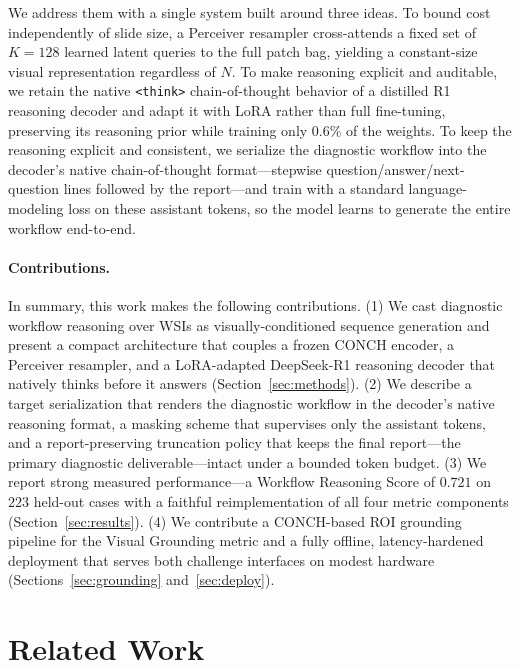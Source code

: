 \documentclass[11pt]{article}
\newcommand{\code}[1]{\texttt{\small #1}}
\begin{document}
We address them with a single system built around three ideas. To bound cost
independently of slide size, a Perceiver resampler cross-attends a fixed set of
$K{=}128$ learned latent queries to the full patch bag, yielding a constant-size
visual representation regardless of $N$. To make reasoning explicit and
auditable, we retain the native \code{<think>} chain-of-thought behavior of a
distilled R1 reasoning decoder and adapt it with LoRA rather than full
fine-tuning, preserving its reasoning prior while training only $0.6\%$ of the
weights. To keep the reasoning explicit and consistent, we serialize the
diagnostic workflow into the decoder's native chain-of-thought format---stepwise
question/answer/next-question lines followed by the report---and train with a
standard language-modeling loss on these assistant tokens, so the model learns to
generate the entire workflow end-to-end.

\paragraph{Contributions.} In summary, this work makes the following
contributions. (1) We cast diagnostic workflow reasoning over WSIs as
visually-conditioned sequence generation and present a compact architecture that
couples a frozen CONCH encoder, a Perceiver resampler, and a LoRA-adapted
DeepSeek-R1 reasoning decoder that natively thinks before it answers
(Section~\ref{sec:methods}). (2) We describe a target serialization that renders
the diagnostic workflow in the decoder's native reasoning format, a masking scheme
that supervises only the assistant tokens, and a report-preserving truncation
policy that keeps the final report---the primary diagnostic deliverable---intact
under a bounded token budget. (3) We report strong
measured performance---a Workflow Reasoning Score of $0.721$ on $223$ held-out
cases with a faithful reimplementation of all four metric components
(Section~\ref{sec:results}). (4) We contribute a CONCH-based ROI grounding
pipeline for the Visual Grounding metric and a fully offline, latency-hardened
deployment that serves both challenge interfaces on modest hardware
(Sections~\ref{sec:grounding} and~\ref{sec:deploy}).

\section{Related Work}
\end{document}
